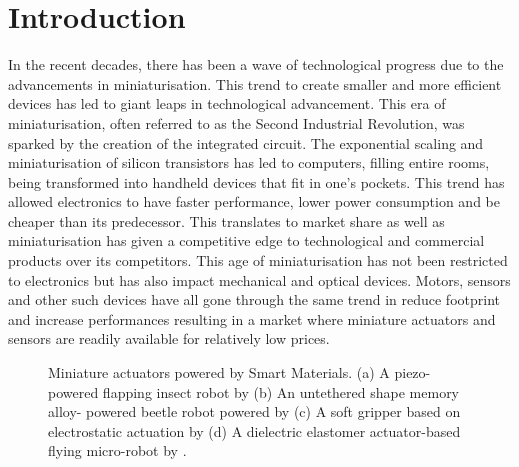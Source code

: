 
\cleardoublepage
\chapter*{Introduction}
In the recent decades, there has been a wave of technological progress due to the advancements in miniaturisation. This trend to create smaller and more efficient devices has led to giant leaps in technological advancement. This era of miniaturisation, often referred to as the Second Industrial Revolution, was sparked by the creation of the integrated circuit. The exponential scaling and miniaturisation of silicon transistors has led to computers, filling entire rooms, being transformed into handheld devices that fit in one's pockets. This trend has allowed electronics to have faster performance, lower power consumption and be cheaper than its predecessor. This translates to market share as well as miniaturisation has given a competitive edge to technological and commercial products over its competitors. This age of miniaturisation has not been restricted to electronics but has also impact mechanical and optical devices. Motors, sensors and other such devices have all gone through the same trend in reduce footprint and increase performances resulting in a market where miniature actuators and sensors are readily available for relatively low prices.

\begin{figure}[hbt!]
    \centering
    \resizebox{0.8\textwidth}{!}{}
    \caption{Miniature actuators powered by Smart Materials. (a) A piezo-powered flapping insect robot by \cite{sreetharanMonolithicFabricationMillimeterscale2012} (b) An untethered shape memory alloy- powered beetle robot powered by \cite{yang88milligramInsectscaleAutonomous2020a} (c) A soft gripper based on electrostatic actuation by \cite{shintakeVersatileSoftGrippers2016} (d) A dielectric elastomer actuator-based flying micro-robot by \cite{chenControlledFlightMicrorobot2019}.}
    \label{fig:smart-actuator-examples}
\end{figure}

